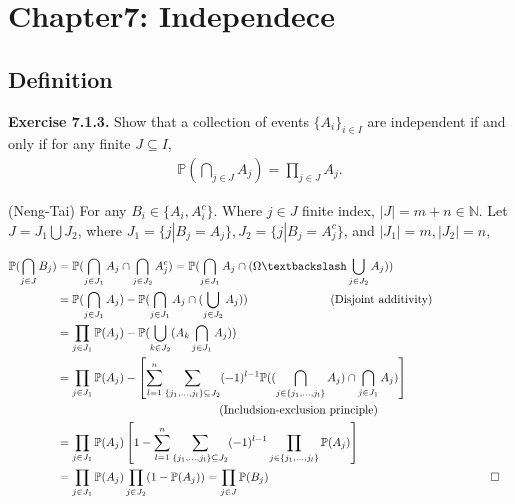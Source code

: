 \section{Chapter7: Independece}

\subsection{Definition}

{\bf Exercise 7.1.3.}
Show that a collection of events $\{ A_i\}_{i \in I}$ are independent if and only if for any finite $J \subseteq I$,
\begin{align*}
\mathbb{P}(\bigcap_{j \in J} A_j) = \prod_{j \in J} A_j.
\end{align*}
\label{7.1.3}
\begin{answer} (Neng-Tai)
    For any $B_i \in \{ A_i, A_i^c\}$. Where $j \in J$ finite index, $|J| = m+n \in \mathbb{N}$. Let $J = J_1 \bigcup J_2$, where $J_1 = \{ j | B_j = A_j\}, J_2 = \{ j| B_j = A_j^c\}$, and $|J_1| = m, |J_2| = n$, 
    
    \begin{equation*}
        \begin{aligned}
            \mathbb{P}(\bigcap_{j \in J} B_j) &= \mathbb{P}(\bigcap_{j \in J_1} A_j \cap \bigcap_{j \in J_2} A_j^c) = \mathbb{P}(\bigcap_{j \in J_1} A_j \cap (\Omega \textbackslash \bigcup_{j \in J_2}A_j)) 
            \\ &= \mathbb{P}(\bigcap_{j \in J_1} A_j) - \mathbb{P}(\bigcap_{j \in J_1} A_j \cap(\bigcup_{j \in J_2}A_j )) \hspace{2.5cm} \text{(Disjoint additivity)} 
            \\ &= \prod_{j \in J_1} \mathbb{P}(A_j) - \mathbb{P}(\bigcup_{k \in J_2} (A_k \bigcap_{j \in J_1} A_j))
            \\ & = \prod_{j \in J_1} \mathbb{P}(A_j) - \left[ \sum\limits_{l = 1}^n \sum\limits_{ \{ j_1,\dots, j_l \} \subseteq J_2} (-1)^{l-1}\mathbb{P}((\bigcap_{j \in  \{ j_1,\dots, j_l \}} A_j) \cap \bigcap_{j \in J_1} A_j) \right]  \\&\qquad \qquad \qquad \qquad \qquad \qquad \qquad  \text{(Includsion-exclusion principle)}
            \\ &= \prod_{j \in J_1} \mathbb{P}(A_j) \left[ 1 - \sum\limits_{l = 1}^n \sum\limits_{ \{ j_1,\dots, j_l \} \subseteq J_2} (-1)^{l-1}\prod_{j \in  \{ j_1,\dots, j_l \}}\mathbb{P}(A_j)  \right]  
            \\ &= \prod_{j \in J_1} \mathbb{P}(A_j) \prod_{j \in J_2} (1 - \mathbb{P}(A_j)) = \prod_{j \in J} \mathbb{P}(B_j)  && 
        \qquad \qed
        \end{aligned}
    \end{equation*}
\end{answer}
